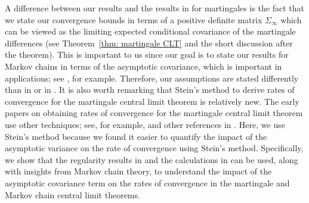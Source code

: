 \documentclass[11pt]{article}
\begin{document}
A difference between our results and the results in \citep{rollin2018quantitative,anastasiou2019normal} for martingales is the fact that we state our convergence bounds in terms of a positive definite matrix $\Sigma_\infty$ which can be viewed as the limiting expected conditional covariance of the martingale differences (see Theorem~\ref{thm: martingale CLT} and the short discussion after the theorem). This is important to us since our goal is to state our results for Markov chains in terms of the asymptotic covariance, which is important in applications; see \citep{borkar2021ode}, for example. Therefore, our assumptions are stated differently than in \cite[Theorem 1]{rollin2018quantitative} or in \cite[Equation 3.1]{anastasiou2019normal}. It is also worth remarking that Stein's method to derive rates of convergence for the martingale central limit theorem is relatively new. The early papers on obtaining rates of convergence for the martingale central limit theorem use other techniques; see, for example, \citep{bolthausen1982exact} and other references in \citep{rollin2018quantitative}. Here, we use Stein's method because we found it easier to quantify the impact of the asymptotic variance on the rate of convergence using Stein's method. Specifically, we show that the regularity results in \citep{gallouet2018regularity,fang2019multivariate} and the calculations in \citep{rollin2018quantitative,gallouet2018regularity} can be used, along with insights from Markov chain theory, to understand the impact of the asymptotic covariance term on the rates of convergence in the martingale and Markov chain central limit theorems. 
\end{document}
